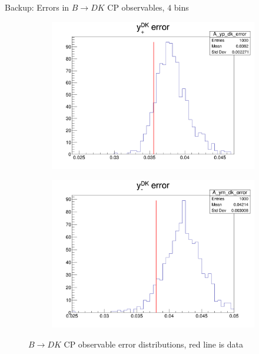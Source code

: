 \documentclass{beamer}
\begin{document}
\begin{frame}{Backup: Errors in $B\to DK$ CP observables, $4$ bins}
\begin{figure}
\begin{subfigure}{0.42\textwidth}
      \includegraphics[width = 1.0\textwidth]{A_yp_dk_4Bins_error.png}
    \end{subfigure}%
    \begin{subfigure}{0.42\textwidth}
      \includegraphics[width = 1.0\textwidth]{A_ym_dk_4Bins_error.png}
    \end{subfigure}
    \caption{$B\to DK$ CP observable error distributions, red line is data}
  \end{figure}
\end{frame}
\end{document}
